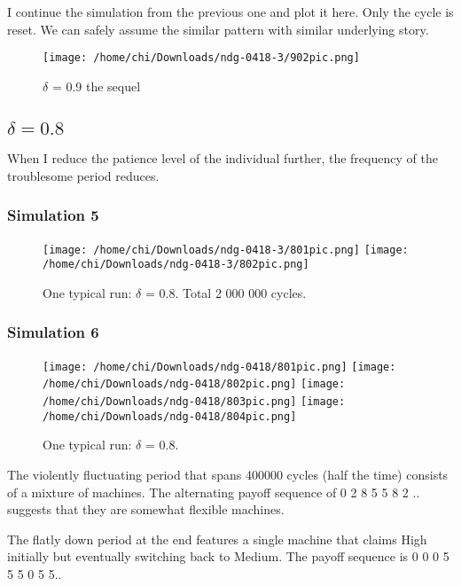 \documentclass[12.5pt]{report}
\begin{document}
I continue the simulation from the previous one and plot it here. Only the cycle is reset. We can safely assume the similar pattern with similar underlying story.

\begin{figure}[h!]
\center
\texttt{[image: /home/chi/Downloads/ndg-0418-3/902pic.png]}
\caption{$\delta$ = 0.9 the sequel}
\end{figure}

\subsection{$\delta = 0.8$}
When I reduce the patience level of the individual further, the frequency of the troublesome period reduces.

\subsubsection{Simulation 5}

\begin{figure}[h!]

\texttt{[image: /home/chi/Downloads/ndg-0418-3/801pic.png]}
\texttt{[image: /home/chi/Downloads/ndg-0418-3/802pic.png]}

\caption{One typical run: $\delta$ = 0.8. Total 2 000 000 cycles.}
\end{figure}


\subsubsection{Simulation 6}
\begin{figure}[h!]

\texttt{[image: /home/chi/Downloads/ndg-0418/801pic.png]}
\texttt{[image: /home/chi/Downloads/ndg-0418/802pic.png]}
\texttt{[image: /home/chi/Downloads/ndg-0418/803pic.png]}
\texttt{[image: /home/chi/Downloads/ndg-0418/804pic.png]}

\caption{One typical run: $\delta$ = 0.8.}
\end{figure}

The violently fluctuating period that spans 400000 cycles (half the time) consists of a mixture of machines. The alternating payoff sequence of 0 2 8 5 5 8 2 .. suggests that they are somewhat flexible machines.

The flatly down period at the end features a single machine that claims High initially but eventually switching back to Medium. The payoff sequence is 0 0 0 5 5 5 0 5 5..
\end{document}
